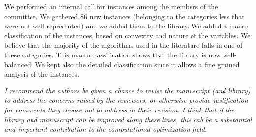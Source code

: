 \documentclass[11pt]{article}
\newcommand{\rep}[1]{{\textcolor{acblue}{#1}}}
\newcommand{\leo}[1]{{\color{red}#1}}
\begin{document}
\rep{
We performed an internal call for instances among the members of the committee. 
We gathered $86$ new instances (belonging to the categories less that were not well represented) and we added them to the library. We added a macro classification of the instances, based on convexity and nature of the variables.
We believe that the majority of the algorithms used in the literature falls in one of these categories.
This macro classification shows that the library is now well-balanced.
We kept also the detailed classification since it allows a fine grained analysis of the instances.
}





{\it
I recommend the authors be given a chance to revise the manuscript (and library) to address the concerns raised by the reviewers, or otherwise provide justification for comments they choose not to address in their revision. I think that if the library and manuscript can be improved along these lines, this cab be a substantial and important contribution to the computational optimization field. 
}
\end{document}
